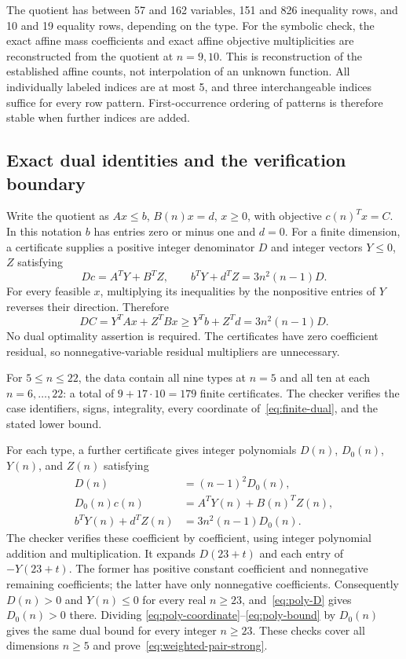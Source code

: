 The quotient has between 57 and 162 variables, 151 and 826 inequality
rows, and 10 and 19 equality rows, depending on the type. For the symbolic
check, the exact affine mass coefficients and exact affine objective
multiplicities are reconstructed from the quotient at $n=9,10$. This is
reconstruction of the established affine counts, not interpolation of an
unknown function. All individually labeled indices are at most 5, and
three interchangeable indices suffice for every row pattern. First-occurrence
ordering of patterns is therefore stable when further indices are added.

\subsection{Exact dual identities and the verification boundary}\label{subsec:pair-certificates}

Write the quotient as $Ax\le b$, $B(n)x=d$, $x\ge0$, with objective
$c(n)^Tx=C$. In this notation $b$ has entries zero or minus one and $d=0$.
For a finite dimension, a certificate supplies a positive integer
denominator $D$ and integer vectors $Y\le0$, $Z$ satisfying
\begin{equation}\label{eq:finite-dual}
 D c=A^TY+B^TZ,\qquad b^TY+d^TZ=3n^2(n-1)D.
\end{equation}
For every feasible $x$, multiplying its inequalities by the nonpositive
entries of $Y$ reverses their direction. Therefore
\[
 D C=Y^TAx+Z^TBx\ge Y^Tb+Z^Td=3n^2(n-1)D.
\]
No dual optimality assertion is required. The certificates have zero
coefficient residual, so nonnegative-variable residual multipliers are
unnecessary.

For $5\le n\le22$, the data contain all nine types at $n=5$ and all
ten at each $n=6,\ldots,22$: a total of $9+17\cdot10=179$ finite
certificates. The checker verifies the case identifiers, signs, integrality,
every coordinate of~\eqref{eq:finite-dual}, and the stated lower bound.

For each type, a further certificate gives integer polynomials
$D(n)$, $D_0(n)$, $Y(n)$, and $Z(n)$ satisfying
\begin{align}
 D(n)&=(n-1)^2D_0(n),\label{eq:poly-D}\\
 D_0(n)c(n)&=A^TY(n)+B(n)^TZ(n),\label{eq:poly-coordinate}\\
 b^TY(n)+d^TZ(n)&=3n^2(n-1)D_0(n).\label{eq:poly-bound}
\end{align}
The checker verifies these coefficient by coefficient, using integer
polynomial addition and multiplication. It expands $D(23+t)$ and each
entry of $-Y(23+t)$. The former has positive constant coefficient and
nonnegative remaining coefficients; the latter have only nonnegative
coefficients. Consequently $D(n)>0$ and $Y(n)\le0$ for every real
$n\ge23$, and~\eqref{eq:poly-D} gives $D_0(n)>0$ there. Dividing
\eqref{eq:poly-coordinate}--\eqref{eq:poly-bound} by $D_0(n)$ gives
the same dual bound for every integer $n\ge23$. These checks cover
all dimensions $n\ge5$ and prove~\eqref{eq:weighted-pair-strong}.


